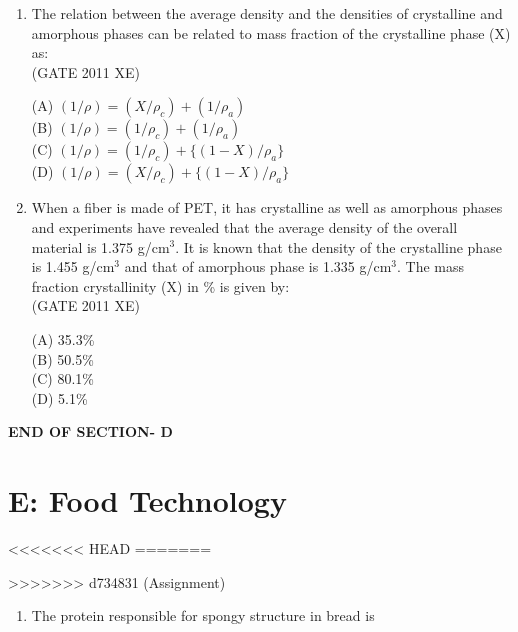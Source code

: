 \documentclass[journal,12pt,onecolumn]{IEEEtran}
\begin{document}
\begin{enumerate}
\begin{enumerate}
\begin{enumerate}[label=\arabic*)]
\item The relation between the average density and the densities of crystalline and amorphous phases can be related to mass fraction of the crystalline phase (X) as:\\

\hfill{(GATE 2011 XE)} \\
\begin{multicols}{4}
(A) $(1/\rho) = (X/\rho_c) + (1/\rho_a)$\\
(B) $(1/\rho) = (1/\rho_c) + (1/\rho_a)$\\
(C) $(1/\rho) = (1/\rho_c) + \{(1 - X)/\rho_a\}$\\
(D) $(1/\rho) = (X/\rho_c) + \{(1 - X)/\rho_a\}$
\end{multicols}

\item When a fiber is made of PET, it has crystalline as well as amorphous phases and experiments have revealed that the average density of the overall material is 1.375 g/cm$^3$. It is known that the density of the crystalline phase is 1.455 g/cm$^3$ and that of amorphous phase is 1.335 g/cm$^3$. The mass fraction crystallinity (X) in \% is given by:\\

\hfill{(GATE 2011 XE)} \\
\begin{multicols}{4}
(A) 35.3\%\\
(B) 50.5\%\\
(C) 80.1\%\\
(D) 5.1\%
\end{multicols}
\end{enumerate}

\vspace{3\baselineskip}
    \begin{center}
    \textbf{\Large END OF SECTION- D}
    \end{center}

\newpage

\section*{E: Food Technology}
<<<<<<< HEAD
\bigskip
=======
\vspace{1cm}

>>>>>>> d734831 (Assignment)
\begin{enumerate}

\item The protein responsible for spongy structure in bread is


\end{enumerate}
\end{enumerate}
\end{enumerate}
\end{document}
